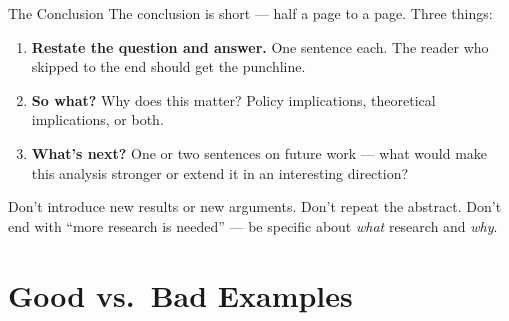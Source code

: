 \begin{frame}{The Conclusion}
  The conclusion is short --- half a page to a page. Three things:

  \vspace{8pt}

  \begin{enumerate}
    \item \textbf{Restate the question and answer.} One sentence each. The reader who skipped to the end should get the punchline.

    \vspace{4pt}

    \item \textbf{So what?} Why does this matter? Policy implications, theoretical implications, or both.

    \vspace{4pt}

    \item \textbf{What's next?} One or two sentences on future work --- what would make this analysis stronger or extend it in an interesting direction?
  \end{enumerate}

  \vspace{8pt}

  Don't introduce new results or new arguments. Don't repeat the abstract. Don't end with ``more research is needed'' --- be specific about \emph{what} research and \emph{why}.
\end{frame}

\section{Good vs.\ Bad Examples}

